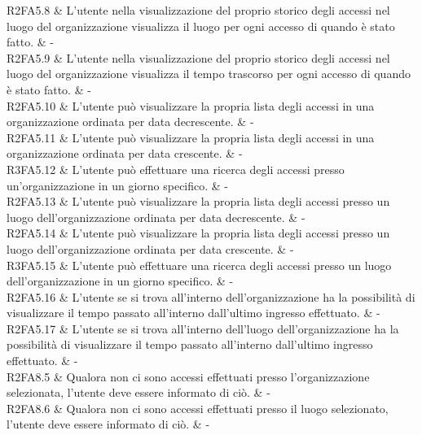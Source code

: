 R2FA5.8 & L'utente nella visualizzazione del proprio storico degli accessi nel luogo del organizzazione visualizza il luogo per ogni accesso di quando è stato fatto.  & - \\

R2FA5.9 & L'utente nella visualizzazione del proprio storico degli accessi nel luogo del organizzazione visualizza il tempo trascorso per ogni accesso di quando è stato fatto.  & - \\

R2FA5.10 & L’utente può visualizzare la propria lista degli accessi in una organizzazione ordinata per data decrescente.  & - \\

R2FA5.11 & L’utente può visualizzare la propria lista degli accessi in una organizzazione ordinata per data crescente.  & - \\

R3FA5.12 & L’utente può effettuare una ricerca degli accessi presso un'organizzazione in un giorno specifico. & - \\

R2FA5.13 & L’utente può visualizzare la propria lista degli accessi presso un luogo dell’organizzazione  ordinata per data decrescente.  & - \\

R2FA5.14 & L’utente può visualizzare la propria lista degli accessi presso un luogo dell’organizzazione  ordinata per data crescente.  & - \\

R3FA5.15 & L’utente può effettuare una ricerca degli accessi presso un luogo dell’organizzazione  in un giorno specifico.  & - \\

R2FA5.16 & L’utente se si trova all’interno dell’organizzazione ha la possibilità di visualizzare il tempo passato all’interno dall'ultimo ingresso effettuato.  & - \\

R2FA5.17 & L’utente se si trova all’interno dell’luogo dell’organizzazione ha la possibilità di visualizzare il tempo passato all’interno dall'ultimo ingresso effettuato.  & - \\

R2FA8.5 & Qualora non ci sono accessi effettuati presso l'organizzazione selezionata, l'utente deve essere informato di ciò. & - \\

R2FA8.6 & Qualora non ci sono accessi effettuati presso il luogo selezionato, l'utente deve essere informato di ciò.  & - \\

